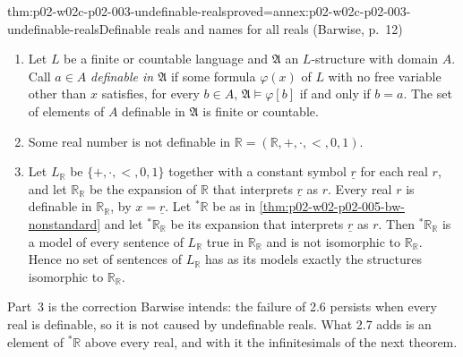 \begin{hbtheorem}{thm:p02-w02c-p02-003-undefinable-reals}{proved=annex:p02-w02c-p02-003-undefinable-reals}{Definable reals and names for all reals (Barwise, p.~12)}
\begin{enumerate}
\item Let \(L\) be a finite or countable language and \(\mathfrak A\) an
      \(L\)-structure with domain \(A\).  Call \(a\in A\)
      \emph{definable in \(\mathfrak A\)} if some formula \(\varphi(x)\) of
      \(L\) with no free variable other than \(x\) satisfies, for every
      \(b\in A\), \(\mathfrak A\models\varphi[b]\) if and only if \(b=a\).
      The set of elements of \(A\) definable in \(\mathfrak A\) is finite or
      countable.
\item Some real number is not definable in
      \(\mathbb R=(\mathbb R,+,\cdot,<,0,1)\).
\item Let \(L_{\mathbb R}\) be \(\{+,\cdot,<,0,1\}\) together with a
      constant symbol \(\underline r\) for each real \(r\), and let
      \(\mathbb R_{\mathbb R}\) be the expansion of \(\mathbb R\) that
      interprets \(\underline r\) as \(r\).  Every real \(r\) is definable
      in \(\mathbb R_{\mathbb R}\), by \(x=\underline r\).  Let
      \({}^*\mathbb R\) be as in \cref{thm:p02-w02-p02-005-bw-nonstandard}
      and let \({}^*\mathbb R_{\mathbb R}\) be its expansion that
      interprets \(\underline r\) as \(r\).  Then
      \({}^*\mathbb R_{\mathbb R}\) is a model of every sentence of
      \(L_{\mathbb R}\) true in \(\mathbb R_{\mathbb R}\) and is not
      isomorphic to \(\mathbb R_{\mathbb R}\).  Hence no set of sentences of
      \(L_{\mathbb R}\) has as its models exactly the structures isomorphic
      to \(\mathbb R_{\mathbb R}\).
\end{enumerate}
\end{hbtheorem}

Part~3 is the correction Barwise intends: the failure of 2.6 persists
when every real is definable, so it is not caused by undefinable reals.
What 2.7 adds is an element of \({}^*\mathbb R\) above every real, and with
it the infinitesimals of the next theorem.

